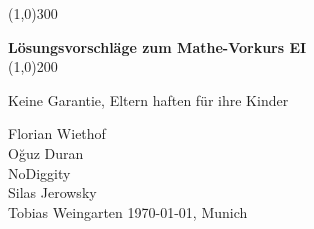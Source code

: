 \begin{titlepage}
	\vspace*{\fill}
	\begin{center}
		\color{gray}\line(1,0){300} \\
		\color{black}
		\vspace{1cm}

		\huge{\bfseries Lösungsvorschläge zum Mathe-Vorkurs EI} \\
		[0.15in]
		\color{gray}\line(1,0){200} \\
		\color{black}

		\vspace{0.5cm}
		\begin{minipage}{8cm}
			\begin{center}
				\large{Keine Garantie, Eltern haften für ihre Kinder}
			\end{center}
		\end{minipage}	
	\end{center}
	\vspace*{\fill}
	\vspace{4cm}
	
	\begin{flushright}
		Florian Wiethof \\
		O\u{g}uz Duran \\
		NoDiggity \\
		Silas Jerowsky \\
		Tobias Weingarten
		\today, Munich
	\end{flushright}
\end{titlepage}



\tableofcontents
{}
\thispagestyle{empty}
\clearpage
\setcounter{page}{1}

